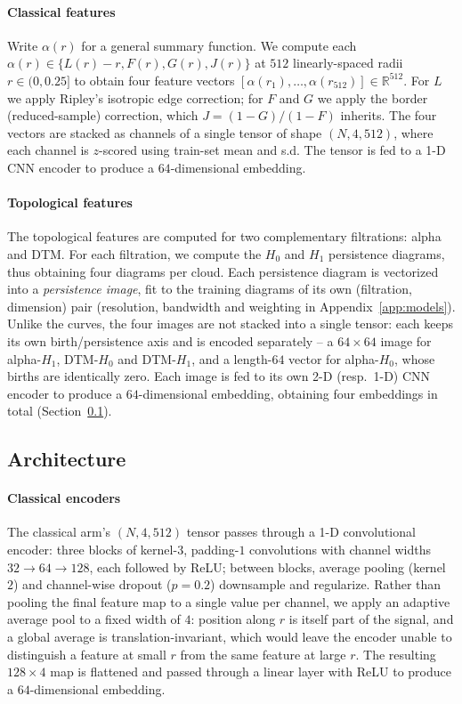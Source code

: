 \documentclass[twoside]{article}
\begin{document}
\paragraph{Classical features} Write $\alpha(r)$ for a general summary function. We compute each $\alpha(r) \in \{L(r)-r, F(r), G(r), J(r)\}$ at $512$ linearly-spaced radii $r \in (0, 0.25]$ to obtain four feature vectors $[\alpha(r_1), \dots, \alpha(r_{512})] \in \mathbb{R}^{512}$. For $L$ we apply Ripley's isotropic edge correction; for $F$ and $G$ we apply the border (reduced-sample) correction, which $J=(1-G)/(1-F)$ inherits. The four vectors are stacked as channels of a single tensor of shape $(N, 4, 512)$, where each channel is $z$-scored using train-set mean and s.d. The tensor is fed to a 1-D CNN encoder to produce a $64$-dimensional embedding.

\paragraph{Topological features} The topological features are computed for two complementary filtrations: alpha and DTM. For each filtration, we compute the $H_0$ and $H_1$ persistence diagrams, thus obtaining four diagrams per cloud. Each persistence diagram is vectorized into a \emph{persistence image}, fit to the training diagrams of its own (filtration, dimension) pair (resolution, bandwidth and weighting in Appendix~\ref{app:models}). Unlike the curves, the four images are not stacked into a single tensor: each keeps its own birth/persistence axis and is encoded separately -- a $64\times64$ image for alpha-$H_1$, DTM-$H_0$ and DTM-$H_1$, and a length-$64$ vector for alpha-$H_0$, whose births are identically zero. Each image is fed to its own 2-D (resp.\ 1-D) CNN encoder to produce a $64$-dimensional embedding, obtaining four embeddings in total (Section~\ref{sec:architecture}).


\subsection{Architecture}
\label{sec:architecture}


\paragraph{Classical encoders} The classical arm's $(N,4,512)$ tensor passes through a 1-D convolutional encoder: three blocks of kernel-$3$, padding-$1$ convolutions with channel widths $32\to64\to128$, each followed by ReLU; between blocks, average pooling (kernel $2$) and channel-wise dropout ($p=0.2$) downsample and regularize. Rather than pooling the final feature map to a single value per channel, we apply an adaptive average pool to a fixed width of $4$: position along $r$ is itself part of the signal, and a global average is translation-invariant, which would leave the encoder unable to distinguish a feature at small $r$ from the same feature at large $r$. The resulting $128\times4$ map is flattened and passed through a linear layer with ReLU to produce a $64$-dimensional embedding.
\end{document}
